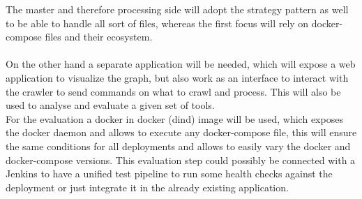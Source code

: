 The master and therefore processing side will adopt the strategy pattern as well to be able to handle all sort of files, whereas the first focus will rely on docker-compose files and their ecosystem.\\
\\
On the other hand a separate application will be needed, which will expose a web application to visualize the graph, but also work as an interface to interact with the crawler to send commands on what to crawl and process. This will also be used to analyse and evaluate a given set of tools.\\
For the evaluation a docker in docker (dind) image will be used, which exposes the docker daemon and allows to execute any docker-compose file, this will ensure the same conditions for all deployments and allows to easily vary the docker and docker-compose versions. This evaluation step could possibly be connected with a Jenkins to have a unified test pipeline to run some health checks against the deployment or just integrate it in the already existing application.\\